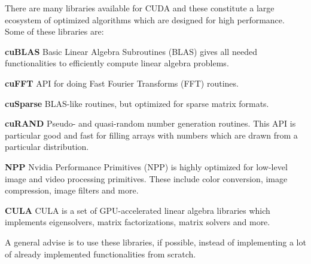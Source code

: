 There are many libraries available for CUDA and these constitute a large ecosystem of optimized algorithms which are designed for high performance.
Some of these libraries are:
\begin{itemizeSmall}
	\item [\textbf{cuBLAS}] Basic Linear Algebra Subroutines (BLAS) gives all needed functionalities to efficiently compute linear algebra problems.
	\item [\textbf{cuFFT}] API for doing Fast Fourier Transforms (FFT) routines.
	\item [\textbf{cuSparse}] BLAS-like routines, but optimized for sparse matrix formats.
	\item [\textbf{cuRAND}] Pseudo- and quasi-random number generation routines. This API is particular good and fast for filling arrays with numbers which are drawn from a particular distribution.
	\item [\textbf{NPP}] Nvidia Performance Primitives (NPP) is highly optimized for low-level image and video processing primitives. These include color conversion, image compression, image filters and more.
	\item [\textbf{CULA}] CULA is a set of GPU-accelerated linear algebra libraries which implements eigensolvers, matrix factorizations, matrix solvers and more.
\end{itemizeSmall}

A general advise is to use these libraries, if possible, instead of implementing a lot of already implemented functionalities from scratch.
